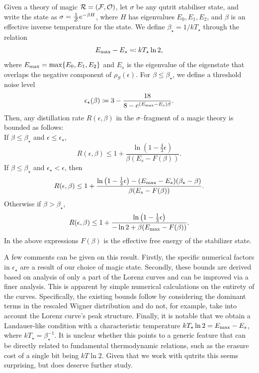 \documentclass[pra,
aps,
twocolumn,
superscriptaddress,
groupedaddress,
nofootinbib,
reprint
]{revtex4-1}
\begin{document}
\begin{theorem}\label{thm:stab_bounds}
	Given a theory of magic $\mathcal{R} = (\mathcal{F}, \mathcal{O})$, let $\sigma$ be any qutrit stabiliser state, and write the state as $\sigma = \frac{1}{\mathcal{Z}} e^{-\beta H}$, where $H$ has eigenvalues $E_0, E_1, E_2$, and $\beta$ is an effective inverse temperature for the state. 
We define $\beta_\star = 1/kT_\star$ through the relation
\begin{equation}
	E_{\rm max} - E_s \eqqcolon kT_\star \ln 2,
\end{equation}
where $E_{\rm max} = \max\{E_0, E_1, E_2\}$ and $E_s$ is the eigenvalue of the eigenstate that overlaps the negative component of $\rho_S(\epsilon)$.  For $\beta \leq \beta_\star$, we define a threshold noise level
\begin{equation}
	\epsilon_{\star}(\beta) \coloneqq 3 - \dfrac{18}{8-e^{(E_{\rm max} - E_s)\beta}}.
\end{equation}
Then, any distillation rate $R(\epsilon, \beta)$ in the $\sigma$--fragment of a magic theory is bounded as follows:\\
If $\beta \leq \beta_{\star}$ and $\epsilon  \leq \epsilon_{\star}$,
\begin{equation}
	R(\epsilon,\beta) \leq 1 + \frac{\ln{\left( 1 - \frac{4}{3}\epsilon \right)}}{\beta (E_s - F(\beta))}.
\end{equation}
If $\beta \leq \beta_{\star}$ and $\epsilon_{\star} < \epsilon$, then
\begin{equation}
	R(\epsilon, \beta) \le 1 + \frac{\ln{\left(1-\frac{1}{3}\epsilon \right)} - (E_{\rm max} - E_s)(\beta_{\star} - \beta)}{\beta (E_s - F(\beta))}.
\end{equation}
Otherwise if $\beta > \beta_{\star}$,
\begin{equation}
	R(\epsilon, \beta) \leq  1+ \frac{\ln{\left(1-\frac{1}{3}\epsilon \right)}}{-\ln{2} + \beta (E_{\rm max} - F(\beta))}.
\end{equation}
In the above expressions $F(\beta)$ is the effective free energy of the stabilizer state.
\end{theorem}
A few comments can be given on this result. 
Firstly, the specific numerical factors in $\epsilon_\star$ are a result of our choice of magic state. 
Secondly, these bounds are derived based on analysis of only a part of the Lorenz curves and can be improved via a finer analysis. 
This is apparent by simple numerical calculations on the entirety of the curves.
Specifically, the existing bounds follow by considering the dominant terms in the rescaled Wigner distribution and do not, for example, take into account the Lorenz curve's peak structure. 
Finally, it is notable that we obtain a Landauer-like condition with a characteristic temperature $kT_\star \ln 2 = E_{\rm max} - E_s$, where $kT_\star = \beta_\star^{-1}$. 
It is unclear whether this points to a generic feature that can be directly related to fundamental thermodynamic relations, such as the erasure cost of a single bit being $kT \ln 2$. 
Given that we work with qutrits this seems surprising, but does deserve further study.
\end{document}
